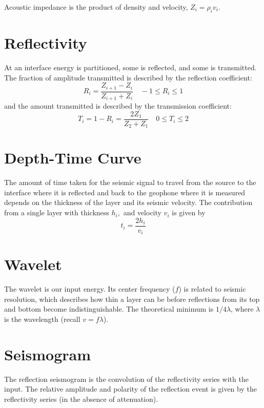 \documentclass{article}[11pt,oneside]
\begin{document}
Acoustic impedance is the product of density and velocity, $Z_i = \rho_i v_i$.

\section*{Reflectivity}
At an interface energy is partitioned, some is reflected, and some is transmitted. The fraction of amplitude transmitted is described by the reflection coefficient:
$$R_i = \frac{Z_{i+1} - Z_i}{Z_{i+1}+Z_i} \quad -1 \leq R_i \leq 1$$
and the amount transmitted is described by the transmission coefficient:
$$T_i = 1-R_i = \frac{2Z_1}{Z_2+Z_1} \quad 0 \leq T_i \leq 2$$


\section*{Depth-Time Curve}
The amount of time taken for the seismic signal to travel from the source to the interface where it is reflected and back to the geophone where it is measured depends on the thickness of the layer and its seismic velocity. The contribution from a single layer with thickness $h_i,$ and velocity $v_i$ is given by
$$t_i = \frac{2h_i}{v_i}$$


\section*{Wavelet}
The wavelet is our input energy. Its center frequency ($f$) is related to seismic resolution, which describes how thin a layer can be before reflections from its top and bottom become indistinguishable. The theoretical minimum is $1/4 \lambda$, where $\lambda$ is the wavelength (recall $v = f\lambda$).

\section*{Seismogram}
The reflection seismogram is the convolution of the reflectivity series with the input. The relative amplitude and polarity of the reflection event is given by the reflectivity series (in the absence of attenuation).
\end{document}
